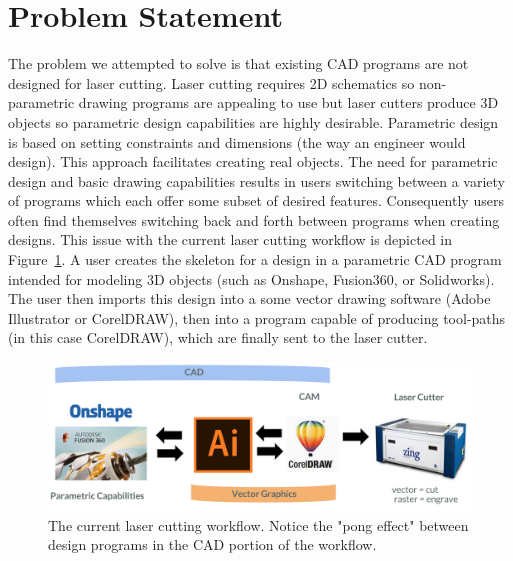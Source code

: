 \section{Problem Statement}

The problem we attempted to solve is that existing CAD programs are not designed for laser cutting. Laser cutting requires 2D schematics so non-parametric drawing programs are appealing to use but laser cutters produce 3D objects so parametric design capabilities are highly desirable. Parametric design is based on setting constraints and dimensions (the way an engineer would design). This approach facilitates creating real objects. The need for parametric design and basic drawing capabilities results in users switching between a variety of programs which each offer some subset of desired features. Consequently users often find themselves switching back and forth between programs when creating designs. This issue with the current laser cutting workflow is depicted in Figure~\ref{fig:laserCuttingWorkflow}. A user creates the skeleton for a design in a parametric CAD program intended for modeling 3D objects (such as Onshape, Fusion360, or Solidworks). The user then imports this design into a some vector drawing software (Adobe Illustrator or CorelDRAW), then into a program capable of producing tool-paths (in this case CorelDRAW), which are finally sent to the laser cutter.

\begin{figure}[!h]
  \includegraphics[width=\linewidth]{laserCuttingWorkflow.jpg}
  \caption{The current laser cutting workflow. Notice the "pong effect" between design programs in the CAD portion of the workflow.}
  \label{fig:laserCuttingWorkflow}
\end{figure}


